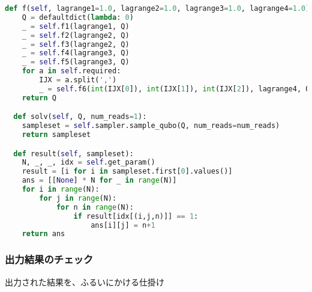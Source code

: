 \documentclass[uplatex,dvipdfmx,a4paper,11pt,oneside,openany]{jsbook}
\begin{document}
\begin{lstlisting}[language=Python]
  def f(self, lagrange1=1.0, lagrange2=1.0, lagrange3=1.0, lagrange4=1.0):
    Q = defaultdict(lambda: 0)
    _ = self.f1(lagrange1, Q)
    _ = self.f2(lagrange2, Q)
    _ = self.f3(lagrange2, Q)
    _ = self.f4(lagrange3, Q)
    _ = self.f5(lagrange3, Q)
    for a in self.required:
        IJX = a.split(',')
        _ = self.f6(int(IJX[0]), int(IJX[1]), int(IJX[2]), lagrange4, Q)
    return Q

  def solv(self, Q, num_reads=1):
    sampleset = self.sampler.sample_qubo(Q, num_reads=num_reads)
    return sampleset

  def result(self, sampleset):
    N, _, _, idx = self.get_param()
    result = [i for i in sampleset.first[0].values()]
    ans = [[None] * N for _ in range(N)]
    for i in range(N):
        for j in range(N):
            for n in range(N):
                if result[idx[(i,j,n)]] == 1:
                    ans[i][j] = n+1
    return ans
\end{lstlisting}

\subsubsection{出力結果のチェック}

出力された結果を、ふるいにかける仕掛け
\end{document}
